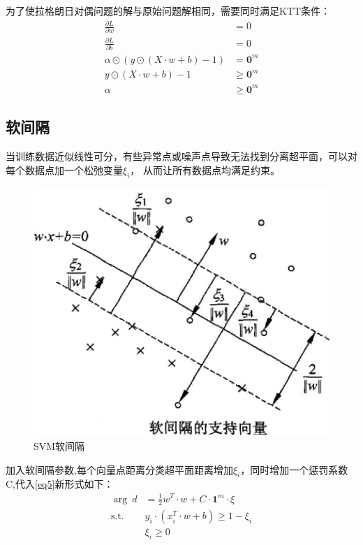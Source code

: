 \documentclass[12pt, a4paper, oneside]{ctexart}
\begin{document}
为了使拉格朗日对偶问题的解与原始问题解相同，需要同时满足KTT条件：
\begin{align}
    \frac{\partial L}{\partial w} &= 0 \nonumber \\
    \frac{\partial L}{\partial b} &= 0 \nonumber \\
    {\alpha} \odot  (y \odot (X \cdot w + b) - 1) &= \boldsymbol{0}^m \nonumber \\
    y \odot (X \cdot w + b) - 1 &\geq \boldsymbol{0}^m \nonumber \\
    {\alpha} &\geq \boldsymbol{0}^m  \nonumber 
\end{align}

\subsection{软间隔}
当训练数据近似线性可分，有些异常点或噪声点导致无法找到分离超平面，可以对每个数据点加一个松弛变量$\xi_i$，
从而让所有数据点均满足约束。
\begin{figure}[htbp]
    \centering
    \includegraphics[width=14cm]{svm_soft.jpg}
    \caption{SVM软间隔}\label{fig2}
\end{figure}

加入软间隔参数,每个向量点距离分类超平面距离增加$\xi_i$，同时增加一个惩罚系数C,代入\eqref{eq5}新形式如下：
\begin{align*}
    \mathop{\arg\min_{w}}  \ d &=  \frac{1}{2}w^T \cdot w + C \cdot \boldsymbol{1}^m \cdot \xi\\
    \mathrm{ s.t. }\ \   & y_i \cdot (x_i^T \cdot w + b) \geq 1	- \xi_i			\\
    & \xi_i	\geq 0		\\
\end{align*}
\end{document}
